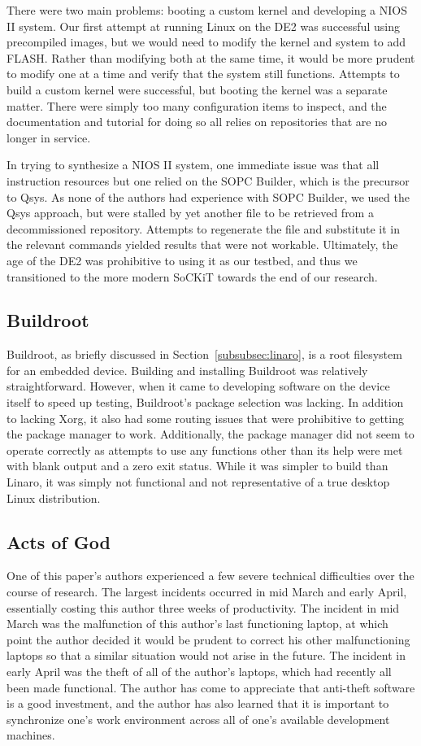 \documentclass{sig-alternate-10pt}
\begin{document}
There were two main problems: booting a custom kernel and developing a NIOS
II system. Our first attempt at running Linux on the DE2 was successful
using precompiled images, but we would need to modify the kernel and system
to add FLASH. Rather than modifying both at the same time, it would be more
prudent to modify one at a time and verify that the system still functions.
Attempts to build a custom kernel were successful, but booting the kernel
was a separate matter. There were simply too many configuration items to
inspect, and the documentation and tutorial for doing so all relies on
repositories that are no longer in service.

In trying to synthesize a NIOS II system, one immediate issue was that all
instruction resources but one relied on the SOPC Builder, which is the precursor to
Qsys. As none of the authors had experience with SOPC Builder, we used the
Qsys approach, but were stalled by yet another file to be retrieved from
a decommissioned repository. Attempts to regenerate the file and substitute
it in the relevant commands yielded results that were not workable.
Ultimately, the age of the DE2 was prohibitive to using it as our testbed,
and thus we transitioned to the more modern SoCKiT towards the end of our
research.

\subsection{Buildroot}
Buildroot, as briefly discussed in Section~\ref{subsubsec:linaro}, is a root
filesystem for an embedded device. Building and installing Buildroot was
relatively straightforward. However, when it came to developing software on
the device itself to speed up testing, Buildroot's package selection was lacking. In
addition to lacking Xorg, it also had some routing issues that were
prohibitive to getting the package manager to work. Additionally, the
package manager did not seem to operate correctly as attempts to use any
functions other than its help were met with blank output and a zero exit
status. While it was simpler to build than Linaro, it was simply not
functional and not representative of a true desktop Linux distribution.

\subsection{Acts of God}
One of this paper's authors experienced a few severe technical difficulties
over the course of research. The largest incidents occurred in mid March and
early April, essentially costing this author three weeks of productivity.
The incident in mid March was the malfunction of this author's last
functioning laptop, at which point the author decided it would be prudent to
correct his other malfunctioning laptops so that a similar situation would
not arise in the future. The incident in early April was the theft of all of
the author's laptops, which had recently all been made functional. The
author has come to appreciate that anti-theft software is a good investment,
and the author has also learned that it is important to synchronize one's
work environment across all of one's available development machines.
\end{document}
